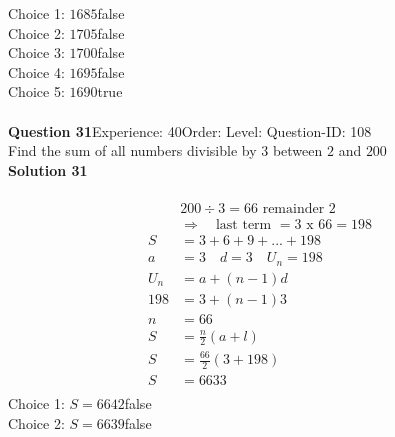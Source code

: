 \documentclass{article}
\begin{document}
Choice 1: \hspace{20pt}$1685$\hspace{20pt}false\\
Choice 2: \hspace{20pt}$1705$\hspace{20pt}false\\
Choice 3: \hspace{20pt}$1700$\hspace{20pt}false\\
Choice 4: \hspace{20pt}$1695$\hspace{20pt}false\\
Choice 5: \hspace{20pt}$1690$\hspace{20pt}true\\
\\[4pt]
\noindent\textbf{Question 31}\hspace{20pt}Experience: 40\hspace{20pt}Order: \hspace{20pt}Level: \hspace{20pt}Question-ID: 108\\[2pt]
Find the sum of all numbers divisible by 3 between $2$ and $200$\\[4pt]
\noindent\textbf{Solution 31}\\[2pt]
\\[-35pt]\begin{align*}
&200 \div 3 = 66 \,\, \text{remainder}\,\, 2\\[2pt]
&\Rightarrow \quad \text{last term }= 3 \,\,\text{x}\,\, 66=198\\[2pt]
S&=3+6+9+...+198\\[12pt]
a&=3\quad d=3 \quad U_n=198\\[2pt]
U_n&=a+(n-1)d\\[2pt]
198&=3+(n-1)3\\[2pt]
n&=66\\[12pt]
S&=\displaystyle\frac{n}{2}(a+l)\\[2pt]
S&=\displaystyle\frac{66}{2}(3+198)\\[2pt]
S&=6633\\
\end{align*}
Choice 1: \hspace{20pt}$S=6642$\hspace{20pt}false\\
Choice 2: \hspace{20pt}$S=6639$\hspace{20pt}false\\
\end{document}
